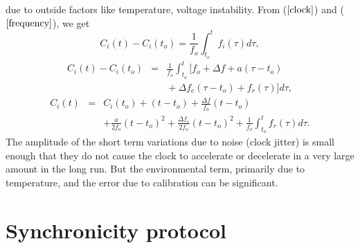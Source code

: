 \documentclass[journal]{IEEEtran}
\begin{document}
due to outside factors like temperature, voltage instability. \newline
From ($\ref{clock}$) and
($\ref{frequency}$), we get
\begin{equation}
C_i(t) - C_i(t_o) = \frac{1}{f_o} \int^{t}_{t_o}f_i(\tau)d\tau ,
\end{equation}
\begin{eqnarray*}
C_i(t) - C_i(t_o) & = & \frac{1}{f_o} \int^{t}_{t_o}{[f_o + \Delta f + a(\tau-t_o)  } \\
 &  & {} + \Delta f_e(\tau-t_o) + f_r(\tau)]d\tau ,
\label{fasika}
\end{eqnarray*}
\begin{eqnarray*}
C_i(t) & = & C_i(t_o) + (t-t_o) +\frac{\Delta f}{f_o}(t-t_o) \\
& & + \frac{a}{2f_o}(t-t_o)^2 + \frac{\Delta f_e}{2f_o}(t-t_o)^2 +
\frac{1}{f_o}\int^{t}_{t_o}{f_r(\tau)d\tau} .
\end{eqnarray*}
The amplitude of the short term variations due to noise (clock
jitter) is small enough that they do not cause the clock to
accelerate or decelerate in a very large amount in the long run. But
the environmental term, primarily due to temperature, and the error
due to calibration can be significant. 
\section{\textbf{Synchronicity protocol}}
\end{document}
